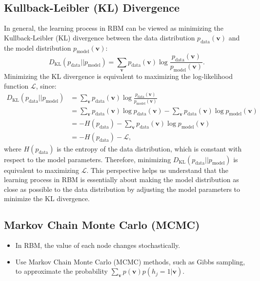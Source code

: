 \documentclass[10pt, a4paper]{article}
\begin{document}
\subsection{Kullback-Leibler (KL) Divergence}
In general, the learning process in RBM can be viewed as minimizing the Kullback-Leibler (KL) divergence
between the data distribution $p_{\text{data}}(\mathbf{v})$ and the model distribution $p_{\text{model}}(\mathbf{v})$:
\begin{equation}
  \label{eq:kl_divergence}
  D_{\text{KL}}(p_{\text{data}} || p_{\text{model}}) = \sum_{\mathbf{v}} p_{\text{data}}(\mathbf{v}) \log \frac{p_{\text{data}}(\mathbf{v})}{p_{\text{model}}(\mathbf{v})}.
\end{equation}
Minimizing the KL divergence is equivalent to maximizing the log-likelihood function $\mathcal{L}$, since:
\begin{align}
  D_{\text{KL}}(p_{\text{data}} || p_{\text{model}}) &= \sum_{\mathbf{v}} p_{\text{data}}(\mathbf{v}) 
              \log \frac{p_{\text{data}}(\mathbf{v})}{p_{\text{model}}(\mathbf{v})} \nonumber \\
          &= \sum_{\mathbf{v}} p_{\text{data}}(\mathbf{v}) \log p_{\text{data}}(\mathbf{v}) - 
              \sum_{\mathbf{v}} p_{\text{data}}(\mathbf{v}) \log p_{\text{model}}(\mathbf{v}) \nonumber \\
          &= -H(p_{\text{data}}) - \sum_{\mathbf{v}} p_{\text{data}}(\mathbf{v}) 
          \log p_{\text{model}}(\mathbf{v}) \nonumber \\
          &= -H(p_{\text{data}}) - \mathcal{L},
\end{align}
where $H(p_{\text{data}})$ is the entropy of the data distribution,
which is constant with respect to the model parameters. 
Therefore, minimizing $D_{\text{KL}}(p_{\text{data}} || p_{\text{model}})$ is equivalent 
to maximizing $\mathcal{L}$. This perspective helps us understand that the learning 
process in RBM is essentially about making the model distribution as close as possible 
to the data distribution by adjusting the model parameters to minimize the KL divergence.


\subsection{Markov Chain Monte Carlo (MCMC)}

\begin{itemize}
  \item In RBM, the value of each node changes stochastically.
  \item Use Markov Chain Monte Carlo (MCMC) methods, such as Gibbs sampling,
    to approximate the probability $\sum_{\mathbf{v}} p(\mathbf{v}) p(h_j=1|\mathbf{v})$.
\end{itemize}
\end{document}
